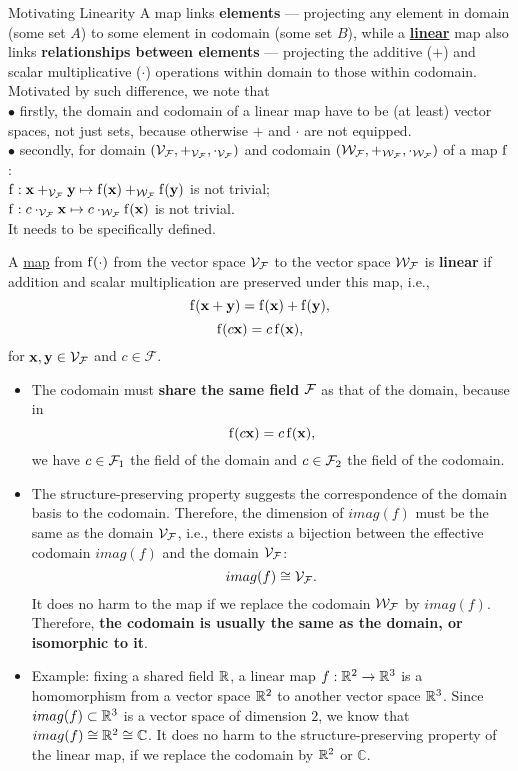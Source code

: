 \begin{textremark*}{Motivating Linearity}
A map links \textbf{elements} --- projecting any element in domain (some set $A$) to some element in codomain (some set $B$), while a \underline{\textbf{linear}} map also links \textbf{relationships between elements} --- projecting the additive ($+$) and scalar multiplicative ($\cdot$) operations within domain to those within codomain.\\
Motivated by such difference, we note that \\
$\bullet$ firstly, the domain and codomain of a linear map have to be (at least) vector spaces, not just sets, because otherwise $+$ and $\cdot$ are not equipped.\\
$\bullet$ secondly, for domain $(\mathcal{V}_{\mathcal{F}}, +_{\mathcal{V}_{\mathcal{F}}}, \cdot_{\mathcal{V}_{\mathcal{F}}})$ and codomain $(\mathcal{W}_{\mathcal{F}}, +_{\mathcal{W}_{\mathcal{F}}}, \cdot_{\mathcal{W}_{\mathcal{F}}})$ of a map $\operatorname{f}$:\\
$\operatorname{f}: \mathbf{x} +_{\mathcal{V}_{\mathcal{F}}} \mathbf{y} \mapsto \operatorname{f}(\mathbf{x}) +_{\mathcal{W}_{\mathcal{F}}} \operatorname{f}(\mathbf{y})$ is not trivial;\\
$\operatorname{f}: c \cdot_{\mathcal{V}_{\mathcal{F}}} \mathbf{x} \mapsto c \cdot_{\mathcal{W}_{\mathcal{F}}} \operatorname{f}(\mathbf{x})$ is not trivial.\\
It needs to be specifically defined.
\end{textremark*}

\begin{definition} 
\label{def:linear-map}
A \hyperref[def:map]{map} from $\operatorname{f}(\cdot)$ from the vector space $\mathcal{V}_{\mathcal{F}}$ to the vector space $\mathcal{W}_{\mathcal{F}}$ is \textbf{linear} if addition and scalar multiplication are preserved under this map, i.e., 
$$\operatorname{f}( \mathbf{x} + \mathbf{y} ) = \operatorname{f}(\mathbf{x}) + \operatorname{f}(\mathbf{y}),$$
$$\operatorname{f}(c \mathbf{x}) = c \operatorname{f}(\mathbf{x}),$$
for $\mathbf{x}, \mathbf{y} \in \mathcal{V}_{\mathcal{F}}$ and $c \in \mathcal{F}$. 
\end{definition}
%
\begin{remark}\label{remark:linearmap}
%
\noindent 
%
\begin{itemize}
    \item The codomain must \textbf{share the same field} ${\mathcal{F}}$ as that of the domain, because in $$\operatorname{f}(c \mathbf{x}) = c \operatorname{f}(\mathbf{x}),$$
    we have $c \in {\mathcal{F}}_1$ the field of the domain and $c \in {\mathcal{F}}_2$ the field of the codomain.
    \item The structure-preserving property suggests the correspondence of the domain basis to the codomain. 
    Therefore, the dimension of $imag(f)$ must be the same as the domain $\mathcal{V}_{\mathcal{F}}$, i.e., there exists a bijection between the effective codomain $imag(f)$ and the domain $\mathcal{V}_{\mathcal{F}}$:
    $$imag(f) \cong \mathcal{V}_{\mathcal{F}}.$$
    It does no harm to the map if we replace the codomain $\mathcal{W}_{\mathcal{F}}$ by $imag(f)$.
    Therefore, \textbf{the codomain is usually the same as the domain, or isomorphic to it}.
    \item Example: fixing a shared field $\mathbb{R}$, a linear map $f: \mathbb{R}^2 \to \mathbb{R}^3$ is a homomorphism from a vector space $\mathbb{R}^2$ to another vector space $\mathbb{R}^3$.
    Since $imag(f) \subset \mathbb{R}^3$ is a vector space of dimension $2$, we know that $imag(f) \cong \mathbb{R}^2 \cong \mathbb{C}$.
    It does no harm to the structure-preserving property of the linear map, if we replace the codomain by $\mathbb{R}^2$ or $\mathbb{C}$.
\end{itemize}
%
\end{remark}

